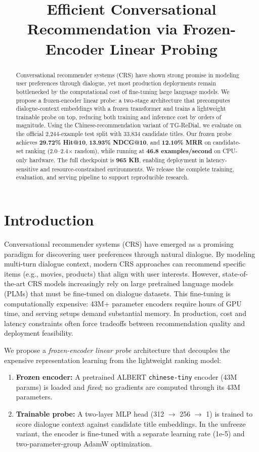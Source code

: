 \documentclass[conference]{IEEEtran}
\title{Efficient Conversational Recommendation via Frozen-Encoder Linear Probing}
\author{
  \IEEEauthorblockN{Project Authors}
  \IEEEauthorblockA{
    TG-ReDial RecSys Project\\
    \texttt{\{paper@email\}\\} 
  }
}
\begin{document}
\maketitle
\thispagestyle{plain}
\pagestyle{plain}

\begin{abstract}
Conversational recommender systems (CRS) have shown strong promise in
modeling user preferences through dialogue, yet most production deployments
remain bottlenecked by the computational cost of fine-tuning large language
models. We propose a frozen-encoder linear probe: a two-stage architecture
that precomputes dialogue-context embeddings with a frozen transformer and
trains a lightweight trainable probe on top, reducing both training and
inference cost by orders of magnitude. Using the Chinese-recommendation
variant of TG-ReDial, we evaluate on the official 2,244-example test split
with 33,834 candidate titles. Our frozen probe achieves
\textbf{29.72\% Hit@10}, \textbf{13.93\% NDCG@10}, and \textbf{12.10\% MRR}
on candidate-set ranking (2.0--2.4$\times$ random), while running at
\textbf{46.8 examples/second} on CPU-only hardware. The full checkpoint is
\textbf{965 KB}, enabling deployment in latency-sensitive and
resource-constrained environments. We release the complete training,
evaluation, and serving pipeline to support reproducible research.
\end{abstract}

\section{Introduction}
Conversational recommender systems (CRS) have emerged as a promising paradigm
for discovering user preferences through natural dialogue. By modeling
multi-turn dialogue context, modern CRS approaches can recommend specific
items (e.g., movies, products) that align with user interests. However,
state-of-the-art CRS models increasingly rely on large pretrained language
models (PLMs) that must be fine-tuned on dialogue datasets. This
fine-tuning is computationally expensive: 43M+ parameter encoders require
hours of GPU time, and serving setups demand substantial memory. In
production, cost and latency constraints often force tradeoffs between
recommendation quality and deployment feasibility.

We propose a \emph{frozen-encoder linear probe} architecture that decouples
the expensive representation learning from the lightweight ranking model:
\begin{enumerate}
  \item \textbf{Frozen encoder:} A pretrained ALBERT \texttt{chinese-tiny}
    encoder (43M params) is loaded and \emph{fixed}; no gradients are
    computed through its 43M parameters.
  \item \textbf{Trainable probe:} A two-layer MLP head (312 $\rightarrow$ 256
    $\rightarrow$ 1) is trained to score dialogue context against candidate
    title embeddings. In the unfreeze variant, the encoder is fine-tuned with
    a separate learning rate (1e-5) and two-parameter-group AdamW
    optimization.
\end{enumerate}
\end{document}
